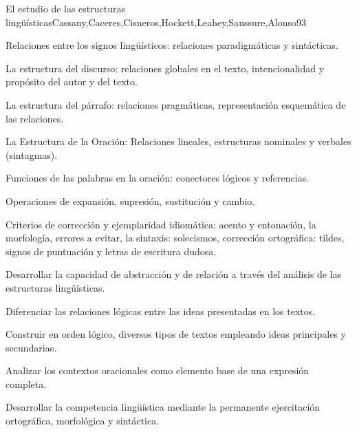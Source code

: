 \begin{syllabus}
\begin{unit}{El estudio de las estructuras lingüísticas}{Cassany,Caceres,Cisneros,Hockett,Leahey,Saussure,Alonso}{9}{3}
\begin{topics}
   \item Relaciones entre los signos lingüísticos: relaciones paradigmáticas y sintácticas.
   \item La estructura del discurso: relaciones globales en el texto, intencionalidad y propósito del autor y del texto. 
   \item La estructura del párrafo: relaciones pragmáticas, representación esquemática de las relaciones. 
   \item La Estructura de la Oración: Relaciones lineales, estructuras nominales y verbales (sintagmas).
   \item Funciones de las palabras en la oración: conectores lógicos y referencias.
   \item Operaciones de expansión, supresión, sustitución y cambio.
   \item Criterios de corrección y ejemplaridad idiomática: acento y entonación, la morfología, errores a evitar, la sintaxis: solecismos, corrección ortográfica: tildes, signos de puntuación y letras de escritura dudosa.
\end{topics}

\begin{learningoutcomes}
   \item Desarrollar la capacidad de abstracción y de relación a través del análisis de las estructuras lingüísticas.
   \item Diferenciar las relaciones lógicas entre las ideas presentadas en los textos.
   \item Construir en orden lógico, diversos tipos de textos empleando ideas principales y secundarias.
   \item Analizar los contextos oracionales como elemento base de una expresión completa.
   \item Desarrollar la competencia lingüística mediante la permanente ejercitación ortográfica, morfológica y sintáctica.
\end{learningoutcomes}
\end{unit}


\end{syllabus}
